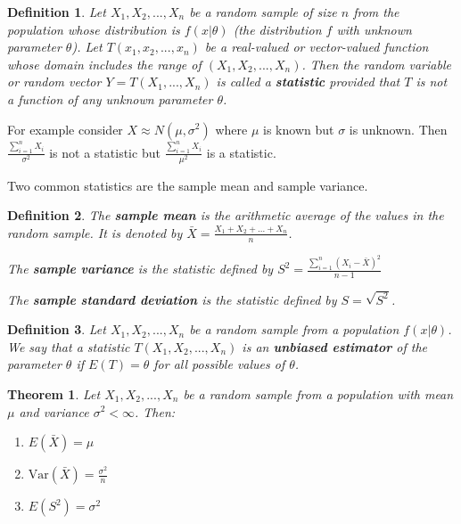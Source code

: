 \documentclass[14pt,twoside]{extreport}
\theoremstyle{dotless}
\newtheorem*{defn}{\footnotesize Definition}
\newtheorem*{thm}{\footnotesize Theorem} %
\begin{document}
\begin{defn}
    Let $X_1, X_2, ..., X_n$ be a random sample of size $n$ from the population whose distribution is $f\left (x|\theta\right )$ (the distribution $f$ with unknown parameter $\theta$). Let $T\left (x_1, x_2, ...,x_n\right )$ be a real-valued or vector-valued function whose domain includes the range of $\left (X_1, X_2, ..., X_n\right )$. Then the random variable or random vector $Y = T\left (X_1, ..., X_n\right )$ is called a \textbf{statistic} provided that $T$ is not a function of any unknown parameter $\theta$.
\end{defn}

For example consider $X \approx N(\mu, \sigma^2)$ where $\mu$ is known but $\sigma$ is unknown. Then $\frac{\sum_{i=1}^n X_i}{\sigma^2}$ is not a statistic but $\frac{\sum_{i=1}^n X_i}{\mu^2}$ is a statistic.

Two common statistics are the sample mean and sample variance.

\begin{defn}
    The \textbf{sample mean} is the arithmetic average of the values in the random sample. It is denoted by $\bar{X} = \displaystyle \frac{X_1 + X_2 + ... + X_n}{n}$.

    The \textbf{sample variance} is the statistic defined by $S^2 = \displaystyle \frac{\sum_{i=1}^n \left (X_i - \bar{X}\right )^2}{n-1}$

    The \textbf{sample standard deviation} is the statistic defined by $S = \sqrt{S^2}$.
\end{defn}

\begin{defn}
    Let $X_1, X_2, ..., X_n$ be a random sample from a population $f\left (x| \theta\right )$. We say that a statistic $T\left (X_1, X_2, ...,X_n\right )$ is an \textbf{unbiased estimator} of the parameter $\theta$ if $E(T) = \theta$ for all possible values of $\theta$.
\end{defn}

\begin{thm}
    Let $X_1, X_2, ..., X_n$ be a random sample from a population with mean $\mu $ and variance $\sigma ^2 < \infty$. Then:
    \begin{enumerate}
        \item $E\left (\bar{X}\right ) = \mu $
        \item $\text{Var}\left (\bar{X}\right ) = \frac{\sigma ^2}{n}$
        \item $E\left (S ^2\right ) = \sigma ^2$
    \end{enumerate}
\end{thm}
\end{document}
